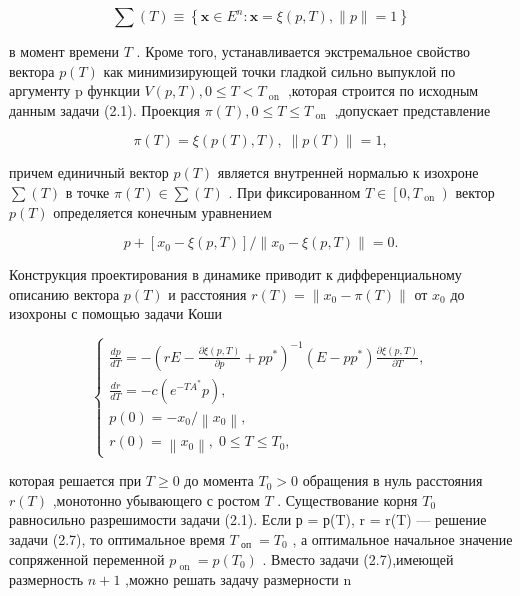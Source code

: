 \documentclass[10pt]{article}
\begin{document}
\[
\sum \left( T\right)  \equiv  \left\{  {\mathbf{x} \in  {E}^{n} : \mathbf{x} = \xi \left( {p,T}\right) ,\parallel p\parallel  = 1}\right\}
\]

в момент времени \(T\) . Кроме того, устанавливается экстремальное свойство вектора \(p\left( T\right)\) как минимизирующей точки гладкой сильно выпуклой по аргументу p функции \(V\left( {p,T}\right) ,0 \leq  T < {T}_{\text{ on }}\) ,которая строится по исходным данным задачи (2.1). Проекция \(\pi \left( T\right) ,0 \leq  T \leq  {T}_{\text{ on }}\) ,допускает представление

\[
\pi \left( T\right)  = \xi \left( {p\left( T\right) ,T}\right) ,\;\parallel p\left( T\right) \parallel  = 1,
\]

причем единичный вектор \(p\left( T\right)\) является внутренней нормалью к изохроне \(\sum \left( T\right)\) в точке \(\pi \left( T\right)  \in  \sum \left( T\right)\) . При фиксированном \(T \in  \left[  {0,{T}_{\text{ on }}}\right)\) вектор \(p\left( T\right)\) определяется конечным уравнением

\[
p + \left[  {{x}_{0} - \xi \left( {p,T}\right) }\right]  /\left\lVert {{x}_{0} - \xi \left( {p,T}\right) } \right\rVert = 0. \tag{2.6}
\]

Конструкция проектирования в динамике приводит к дифференциальному описанию вектора \(p\left( T\right)\) и расстояния \(r\left( T\right)  = \left\lVert {{x}_{0} - \pi \left( T\right) } \right\rVert\) от \({x}_{0}\) до изохроны с помощью задачи Коши

\[
\left\{  \begin{array}{l} \frac{dp}{dT} =  - {\left( rE - \frac{\partial \xi \left( {p,T}\right) }{\partial p} + p{p}^{ * }\right) }^{-1}\left( {E - p{p}^{ * }}\right) \frac{\partial \xi \left( {p,T}\right) }{\partial T}, \\  \frac{dr}{dT} =  - c\left( {{e}^{-T{A}^{ * }}p}\right) , \\  p\left( 0\right)  =  - {x}_{0}/\left\lVert {x}_{0} \right\rVert, \\  r\left( 0\right)  = \left\lVert {x}_{0} \right\rVert,\;0 \leq  T \leq  {T}_{0}, \end{array}\right. \tag{2.7}
\]

которая решается при \(T \geq  0\) до момента \({T}_{0} > 0\) обращения в нуль расстояния \(r\left( T\right)\) ,монотонно убывающего с ростом \(T\) . Существование корня \({T}_{0}\) равносильно разрешимости задачи (2.1). Если р = р(T), r = r(T) — решение задачи (2.7), то оптимальное время \({T}_{\text{ оп }} = {T}_{0}\) , а оптимальное начальное значение сопряженной переменной \({p}_{\text{ on }} = p\left( {T}_{0}\right)\) . Вместо задачи (2.7),имеющей размерность \(n + 1\) ,можно решать задачу размерности n
\end{document}
